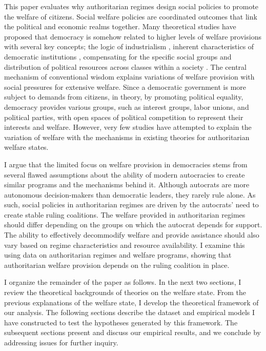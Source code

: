 \documentclass[11pt]{article}
\begin{document}
This paper evaluates why authoritarian regimes design social policies to promote the welfare of citizens. Social welfare policies are coordinated outcomes that link the political and economic realms together. Many theoretical studies have proposed that democracy is somehow related to higher levels of welfare provisions \citep{Muller1988, Sirowy1990, Korpi1998} with several key concepts; the logic of industrialism \citep{Heclo1974, Wilensky1975, PrzeworskiandLimongi1993}, inherent characteristics of democratic institutions \citep{Muller1988, Pierson1996, Gerring2012}, compensating for the specific social groups \citep{Cameron1978, Rodrik1998, Burgoon2001a, Adsera2002} and distribution of political resources across classes within a society \citep{Korpi1998, Gosta1989, Gosta1990}. The central mechanism of conventional wisdom explains variations of welfare provision with social pressures for extensive welfare. Since a democratic government is more subject to demands from citizens, in theory, by promoting political equality, democracy provides various groups, such as interest groups, labor unions, and political parties, with open spaces of political competition to represent their interests and welfare. However, very few studies have attempted to explain the variation of welfare with the mechanisms in existing theories for authoritarian welfare states.\par

I argue that the limited focus on welfare provision in democracies stems from several flawed assumptions about the ability of modern autocracies to create similar programs and the mechanisms behind it. Although autocrats are more autonomous decision-makers than democratic leaders, they rarely rule alone. As such, social policies in authoritarian regimes are driven by the autocrats’ need to create stable ruling coalitions. The welfare provided in authoritarian regimes should differ depending on the groups on which the autocrat depends for support. The ability to effectively decommodify welfare and provide assistance should also vary based on regime characteristics and resource availability. I examine this using data on authoritarian regimes and welfare programs, showing that authoritarian welfare provision depends on the ruling coalition in place.\par

I organize the remainder of the paper as follows. In the next two sections, I review the theoretical backgrounds of theories on the welfare state. From the previous explanations of the welfare state, I develop the theoretical framework of our analysis. The following sections describe the dataset and empirical models I have constructed to test the hypotheses generated by this framework. The subsequent sections present and discuss our empirical results, and we conclude by addressing issues for further inquiry.
\end{document}
